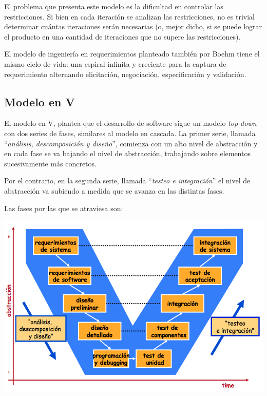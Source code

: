 \documentclass[]{article}
\begin{document}
El problema que presenta este modelo es la dificultad en controlar las restricciones. Si bien en cada iteración se analizan las restricciones, no es trivial determinar cuántas iteraciones serán necesarias (o, mejor dicho, si se puede lograr el producto en una cantidad de iteraciones que no supere las restricciones).

El modelo de ingeniería en requerimientos planteado también por Boehm tiene el mismo ciclo de vida: una espiral infinita y creciente para la captura de requerimiento alternando elicitación, negociación, especificación y validación.

\subsection{Modelo en V}
El modelo en V, plantea	que el desarrollo de software sigue un modelo \textit{top-down} con dos series de fases, similares al modelo en cascada. La primer serie, llamada ``\textit{análisis, descomposición y diseño}'', comienza con un alto nivel de abstracción y en cada fase se va bajando el nivel de abstracción, trabajando sobre elementos sucesivamente más concretos.

Por el contrario, en la segunda serie, llamada ``\textit{testeo e integración}'' el nivel de abstracción va subiendo a medida que se avanza en las distintas fases.

Las fases por las que se atraviesa son:

\begin{center}
	\includegraphics[scale=0.50]{Vmodel.png}
\end{center}
\end{document}
